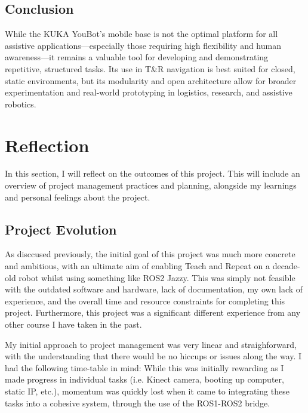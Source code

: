 \documentclass[a4paper, 12pt]{article}
\newif\ifshownotes
\newcommand{\notes}[1]{\ifshownotes\textcolor{blue}{#1}\fi}
\begin{document}
    \subsection{Conclusion}

    While the KUKA YouBot’s mobile base is not the optimal platform for all assistive applications---especially those requiring high flexibility and human awareness---it remains a valuable tool for developing and demonstrating repetitive, structured tasks. Its use in T\&R navigation is best suited for closed, static environments, but its modularity and open architecture allow for broader experimentation and real-world prototyping in logistics, research, and assistive robotics.

    


    \pagebreak

    \section{Reflection}

    \notes{draft 1, 11.05 6pm}

    In this section, I will reflect on the outcomes of this project. This will include an overview of project management practices and planning, alongside my learnings and personal feelings about the project. 

    \subsection{Project Evolution}

    As disccused previously, the initial goal of this project was much more concrete and ambitious, with an ultimate aim of enabling Teach and Repeat on a decade-old robot whilst using something like ROS2 Jazzy. This was simply not feasible with the outdated software and hardware, lack of documentation, my own lack of experience, and the overall time and resource constraints for completing this project. Furthermore, this project was a significant different experience from any other course I have taken in the past.
    
    My initial approach to project management was very linear and straighforward, with the understanding that there would be no hiccups or issues along the way. I had the following time-table in mind: \notes{maybe insert a table showcasing the plan here?} While this was initially rewarding as I made progress in individual tasks (i.e. Kinect camera, booting up computer, static IP, etc.), momentum was quickly lost when it came to integrating these tasks into a cohesive system, through the use of the ROS1-ROS2 bridge. 
\end{document}
